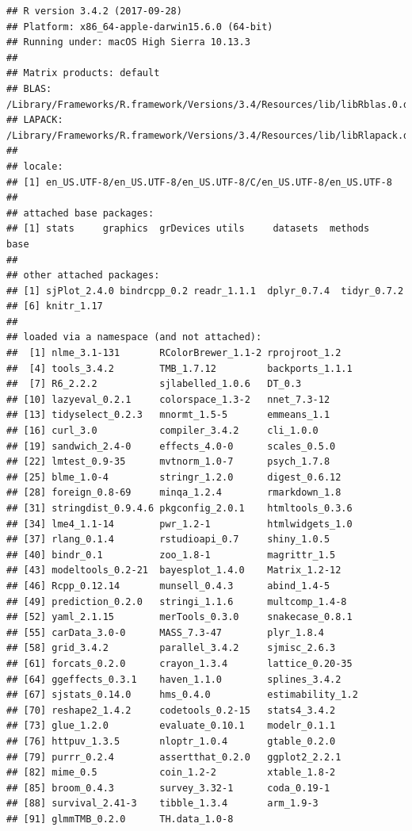 \documentclass[]{article}
\begin{document}
\begin{verbatim}
## R version 3.4.2 (2017-09-28)
## Platform: x86_64-apple-darwin15.6.0 (64-bit)
## Running under: macOS High Sierra 10.13.3
## 
## Matrix products: default
## BLAS: /Library/Frameworks/R.framework/Versions/3.4/Resources/lib/libRblas.0.dylib
## LAPACK: /Library/Frameworks/R.framework/Versions/3.4/Resources/lib/libRlapack.dylib
## 
## locale:
## [1] en_US.UTF-8/en_US.UTF-8/en_US.UTF-8/C/en_US.UTF-8/en_US.UTF-8
## 
## attached base packages:
## [1] stats     graphics  grDevices utils     datasets  methods   base     
## 
## other attached packages:
## [1] sjPlot_2.4.0 bindrcpp_0.2 readr_1.1.1  dplyr_0.7.4  tidyr_0.7.2 
## [6] knitr_1.17  
## 
## loaded via a namespace (and not attached):
##  [1] nlme_3.1-131       RColorBrewer_1.1-2 rprojroot_1.2     
##  [4] tools_3.4.2        TMB_1.7.12         backports_1.1.1   
##  [7] R6_2.2.2           sjlabelled_1.0.6   DT_0.3            
## [10] lazyeval_0.2.1     colorspace_1.3-2   nnet_7.3-12       
## [13] tidyselect_0.2.3   mnormt_1.5-5       emmeans_1.1       
## [16] curl_3.0           compiler_3.4.2     cli_1.0.0         
## [19] sandwich_2.4-0     effects_4.0-0      scales_0.5.0      
## [22] lmtest_0.9-35      mvtnorm_1.0-7      psych_1.7.8       
## [25] blme_1.0-4         stringr_1.2.0      digest_0.6.12     
## [28] foreign_0.8-69     minqa_1.2.4        rmarkdown_1.8     
## [31] stringdist_0.9.4.6 pkgconfig_2.0.1    htmltools_0.3.6   
## [34] lme4_1.1-14        pwr_1.2-1          htmlwidgets_1.0   
## [37] rlang_0.1.4        rstudioapi_0.7     shiny_1.0.5       
## [40] bindr_0.1          zoo_1.8-1          magrittr_1.5      
## [43] modeltools_0.2-21  bayesplot_1.4.0    Matrix_1.2-12     
## [46] Rcpp_0.12.14       munsell_0.4.3      abind_1.4-5       
## [49] prediction_0.2.0   stringi_1.1.6      multcomp_1.4-8    
## [52] yaml_2.1.15        merTools_0.3.0     snakecase_0.8.1   
## [55] carData_3.0-0      MASS_7.3-47        plyr_1.8.4        
## [58] grid_3.4.2         parallel_3.4.2     sjmisc_2.6.3      
## [61] forcats_0.2.0      crayon_1.3.4       lattice_0.20-35   
## [64] ggeffects_0.3.1    haven_1.1.0        splines_3.4.2     
## [67] sjstats_0.14.0     hms_0.4.0          estimability_1.2  
## [70] reshape2_1.4.2     codetools_0.2-15   stats4_3.4.2      
## [73] glue_1.2.0         evaluate_0.10.1    modelr_0.1.1      
## [76] httpuv_1.3.5       nloptr_1.0.4       gtable_0.2.0      
## [79] purrr_0.2.4        assertthat_0.2.0   ggplot2_2.2.1     
## [82] mime_0.5           coin_1.2-2         xtable_1.8-2      
## [85] broom_0.4.3        survey_3.32-1      coda_0.19-1       
## [88] survival_2.41-3    tibble_1.3.4       arm_1.9-3         
## [91] glmmTMB_0.2.0      TH.data_1.0-8
\end{verbatim}
\end{document}
